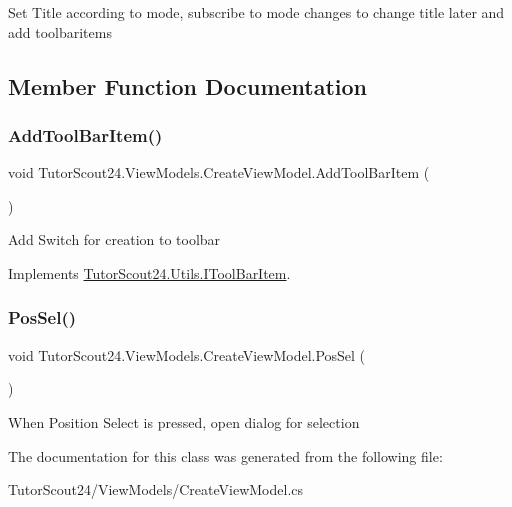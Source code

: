 Set Title according to mode, subscribe to mode changes to change title later and add toolbaritems 



\subsection{Member Function Documentation}
\mbox{\label{class_tutor_scout24_1_1_view_models_1_1_create_view_model_afa96e3fde1e926d0bc909a817a8bdaaf}} 
\subsubsection{\texorpdfstring{Add\+Tool\+Bar\+Item()}{AddToolBarItem()}}
{\footnotesize\ttfamily void Tutor\+Scout24.\+View\+Models.\+Create\+View\+Model.\+Add\+Tool\+Bar\+Item (\begin{DoxyParamCaption}{ }\end{DoxyParamCaption})\hspace{0.3cm}{\ttfamily [inline]}}



Add Switch for creation to toolbar 



Implements \mbox{\hyperlink{interface_tutor_scout24_1_1_utils_1_1_i_tool_bar_item}{Tutor\+Scout24.\+Utils.\+I\+Tool\+Bar\+Item}}.

\mbox{\label{class_tutor_scout24_1_1_view_models_1_1_create_view_model_a5002145ea2bc96424f202caee461f810}} 
\subsubsection{\texorpdfstring{Pos\+Sel()}{PosSel()}}
{\footnotesize\ttfamily void Tutor\+Scout24.\+View\+Models.\+Create\+View\+Model.\+Pos\+Sel (\begin{DoxyParamCaption}{ }\end{DoxyParamCaption})\hspace{0.3cm}{\ttfamily [inline]}}



When Position Select is pressed, open dialog for selection 



The documentation for this class was generated from the following file\+:\begin{DoxyCompactItemize}
\item 
Tutor\+Scout24/\+View\+Models/Create\+View\+Model.\+cs\end{DoxyCompactItemize}
